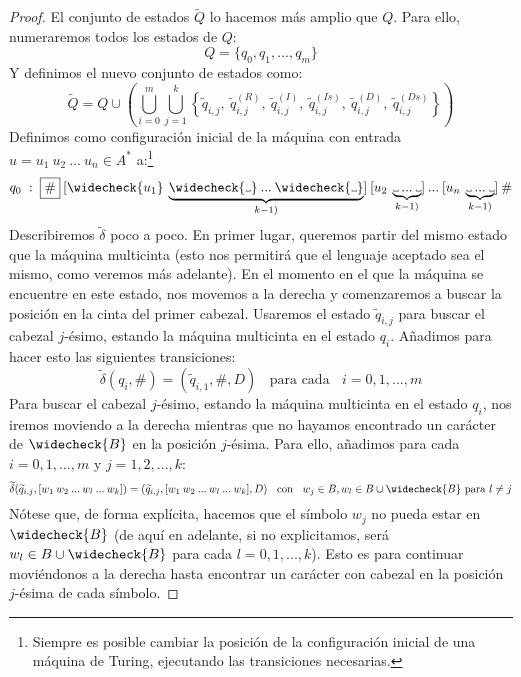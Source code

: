 \begin{proof}
El conjunto de estados $\widetilde{Q}$ lo hacemos más amplio que $Q$. Para ello, numeraremos todos los estados de $Q$:
$$
    Q=\{q_0,q_1,...,q_m\}
$$
Y definimos el nuevo conjunto de estados como:
$$
    \widetilde{Q}=Q\cup\left(\bigcup_{i=0}^m\bigcup_{j=1}^k\left\{\widetilde{q}_{i,j},\:\widetilde{q}_{i,j}^{(R)},\:\widetilde{q}_{i,j}^{(I)},\:\widetilde{q}_{i,j}^{(Is)},\:\widetilde{q}_{i,j}^{(D)},\:\widetilde{q}_{i,j}^{(Ds)}\right\}\right)
$$
Definimos como configuración inicial de la máquina con entrada $u=u_1\:u_2\:...\:u_n\in A^*$ a:\footnote{Siempre es posible cambiar la posición de la configuración inicial de una máquina de Turing, ejecutando las transiciones necesarias.}
$$
    q_0\;:\;\fbox{\#}\:[\widecheck{u_1}\:\underbrace{\widecheck{\Vtextvisiblespace} \:... \:\widecheck{\Vtextvisiblespace}}_{k-1)}]\:[u_2\:\underbrace{{\Vtextvisiblespace} \:... \:{\Vtextvisiblespace}}_{k-1)}]\:...\:[u_n\:\underbrace{{\Vtextvisiblespace} \:... \:{\Vtextvisiblespace}}_{k-1)}]\:\#
$$
Describiremos $\widetilde{\delta}$ poco a poco. En primer lugar, queremos partir del mismo estado que la máquina multicinta (esto nos permitirá que el lenguaje aceptado sea el mismo, como veremos más adelante). En el momento en el que la máquina se encuentre en este estado, nos movemos a la derecha y comenzaremos a buscar la posición en la cinta del primer cabezal. Usaremos el estado $\widetilde{q}_{i,j}$ para buscar el cabezal $j$-ésimo, estando la máquina multicinta en el estado $q_i$. Añadimos para hacer esto las siguientes transiciones:
\begin{equation}
    \widetilde{\delta}(q_i, \#) = (\widetilde{q}_{i,1}, \#, D)\;\;\text{ para cada }\;\;i=0,1,...,m
\end{equation}
Para buscar el cabezal $j$-ésimo, estando la máquina multicinta en el estado $q_i$, nos iremos moviendo a la derecha mientras que no hayamos encontrado un carácter de $\widecheck{B}$ en la posición $j$-ésima. Para ello, añadimos para cada $i=0,1,...,m$ y $j=1,2,...,k$:
\begin{equation}
    \widetilde{\delta}(\widetilde{q}_{i,j}, [ w_1\:w_2\:...\:w_l\:...\:w_k]) = (\widetilde{q}_{i,j}, [ w_1\:w_2\:...\:w_l\:...\:w_k], D)\;\;\text{ con }\;\;w_j\in B, w_l \in B\cup\widecheck{B} \text{ para } l \neq j
\end{equation}
Nótese que, de forma explícita, hacemos que el símbolo $w_j$ no pueda estar en $\widecheck{B}$ (de aquí en adelante, si no explicitamos, será $w_l\in B\cup\widecheck{B}$ para cada $l=0,1,...,k$). Esto es para continuar moviéndonos a la derecha hasta encontrar un carácter con cabezal en la posición $j$-ésima de cada símbolo.


\end{proof}
